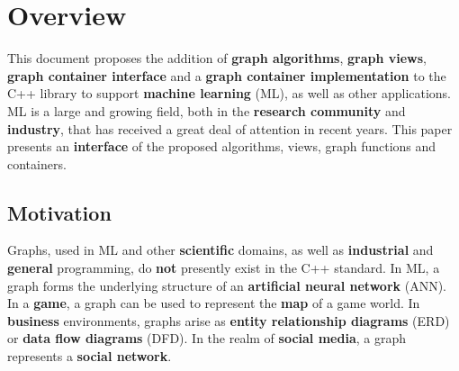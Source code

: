 
\chapter{Overview}

This document proposes the addition of \textbf{graph algorithms}, \textbf{graph views}, \textbf{graph container interface} and a \textbf{graph container implementation} to the C++ library to support \textbf{machine learning} (ML), as well as other applications. ML is a large and growing field, both in the \textbf{research community} and \textbf{industry}, that has received a great deal of attention in recent years. This paper presents an \textbf{interface} of the proposed algorithms, views, graph functions and containers.

\section{Motivation}
Graphs, used in ML and other \textbf{scientific} domains, as well as \textbf{industrial} and \textbf{general} programming, do \textbf{not} presently exist in the C++ standard. In ML, a graph forms the underlying structure of an \textbf{artificial neural network} (ANN). In a \textbf{game}, a graph can be used to
represent the \textbf{map} of a game world. In \textbf{business} environments, graphs arise as \textbf{entity relationship diagrams} (ERD) or \textbf{data flow diagrams} (DFD). In the realm of \textbf{social media}, a graph represents a \textbf{social network}.


